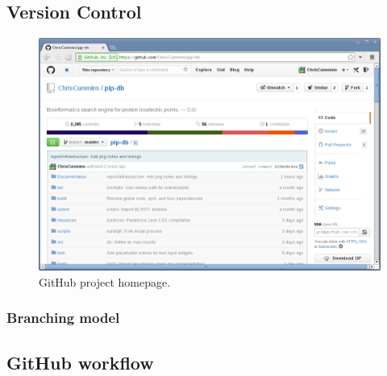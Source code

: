 \subsection{Version Control}\label{subsec:version-control}


\cite{finley2011github}


\begin{figure}[H]
\centering
    \includegraphics[width=\textwidth]{assets/github}
\caption[GitHub project homepage]
        {GitHub project homepage.}
\label{fig:github-project}
\end{figure}


\subsubsection{Branching model}

\cite{driessen2012successful}

\subsection{GitHub workflow}\label{subsec:github-workflow}





